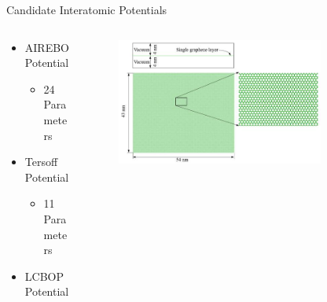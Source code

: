 \documentclass[handout,xcolor={x11names,table},compress,svgnames,mathserif]{beamer}
\renewcommand{\(}{\begin{columns}}
\renewcommand{\)}{\end{columns}}
\newcommand{\<}[1]{\begin{column}{#1}}
\renewcommand{\>}{\end{column}}
\newcommand*\myitem{%
  \item[\color{DeepSkyBlue4}\scalebox{0.6}{\ding{110}}]}
\begin{document}
\begin{frame}{Candidate Interatomic Potentials}

\begin{columns}
\begin{column}{0.4\textwidth}

\begin{itemize}
\myitem AIREBO Potential
\begin{itemize} \item 24 Parameters \end{itemize}
\vspace{2mm}

\myitem Tersoff Potential
\begin{itemize} \item 11 Parameters \end{itemize}
\vspace{2mm}

\myitem LCBOP Potential
\end{itemize}

\end{column}

\begin{column}{0.6\textwidth}
%
\begin{figure}[htbp]
\begin{center}
\includegraphics[width=0.8\textwidth]{./Figures/Graphene}
\end{center}
\end{figure}
%

\end{column}
\end{columns}

\end{frame}

\end{document}
